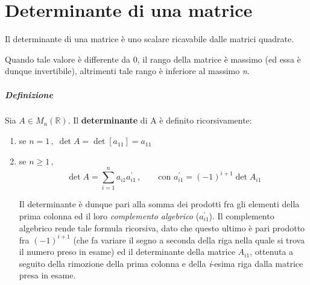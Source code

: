 \chapter{Determinante di una matrice}

	Il determinante di una matrice è uno scalare ricavabile dalle matrici quadrate.
	
	Quando tale valore è differente da 0, il rango della matrice è massimo (ed essa è dunque invertibile), altrimenti tale rango è inferiore al massimo \textit{n}.
	
	\paragraph{Definizione} Sia $A \in M_n (\mathbb{R})$. Il \textbf{determinante} di A è definito ricorsivamente:
	\begin{enumerate}
		\item se $n = 1\, , \; \det A = \det [a_{11}] = a_{11} $
		\item se $n \ge 1\, , $  
		$$ \det A = \sum_{i=1}^{n} a_{i1} a_{i1}^{\prime} \, , \qquad \text{con } a_{i1}^{\prime} = (-1)^{i + 1} \det A_{i1} $$
		
		Il determinante è dunque pari alla somma dei prodotti fra gli elementi della prima colonna ed il loro \emph{complemento algebrico} ($a_{i1}^{\prime}$). Il complemento algebrico rende tale formula ricorsiva, dato che questo ultimo è pari prodotto fra $(-1)^{i + 1}$ (che fa variare il segno a seconda della riga nella quale si trova il numero preso in esame) ed il determinante della matrice $A_{i1}$, ottenuta a seguito della rimozione della prima colonna e della \textit{i}-esima riga dalla matrice presa in esame.
	\end{enumerate}
	
